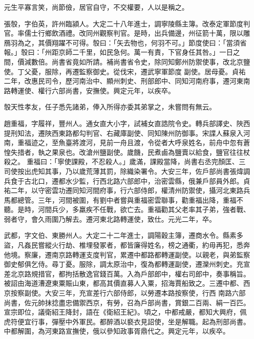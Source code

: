 \begin{pinyinscope}
 元生平寡言笑，尚節儉，居官自守，不交權要，人以是稱之。



 張彀，字伯英，許州臨潁人。大定二十八年進士，調寧陵縣主簿。改泰定軍節度判官。率儒士行鄉飲酒禮。改同州觀察判官。是時，出兵備邊，州征箭十萬，限以雕鴈羽為之，其價翔躍不可得。彀曰：「矢去物也，何羽不可。」節度使曰：「當須省報。」彀曰：「州距京師二千里，如民急何。萬一有責，下官身任其咎。」一日之間，價減數倍。尚書省竟如所請。補尚書省令史，除同知鄭州防禦使事，改北京鹽使。丁父憂，服除，再遷監察御史。從伐宋，遷武寧軍節度
 副使。居母憂。貞祐二年，改惠民司令，歷河南治中、顯州刺史、刑部郎中、同知河南府事，遷河東南路轉運使、權行六部尚書，安撫使。興定元年，以疾卒。



 彀天性孝友，任子悉先諸弟，俸入所得亦委其弟掌之，未嘗問有無云。



 趙重福，字履祥，豐州人。通女直大小字，試補女直誥院令史。轉兵部譯史、陜西提刑知法，遷陜西東路都勾判官、右藏庫副使、同知陳州防御事。宋諜人蘇泉入河南，重福迹之，至魚臺將渡河，見前一舟且渡，令從者大呼泉姓名，前舟中忽有蒼惶失措者，執之果泉也。改滄州鹽副使。歲饑，民煮鹵為鹽賣以給食，鹽官往往杖殺之。
 重福曰：「寧使課殿，不忍殺人。」歲滿，課殿當降，尚書右丞完顏匡、三司使按出虎知其事，乃以歲荒薄其罰，除織染署令。大安三年，佐戶部尚書張煒調兵食于古北口，遷都水少監，行西北路六部郎中，治密雲縣，俄兼戶部員外郎。貞祐二年，以守密雲功遷同知河間府事，行六部侍郎，權清州防禦使，攝河北東路兵馬都總管。三年，河間被圍，有劉中者嘗與重福密雲聯事，勸重福出降，重福不聽。是時，河間兵少，多羸疾不任戰，欲亡去。重福勸其父老率其子弟，強者戰、弱者守，會久雨圍乃解去。遷河東北路轉運使，致仕。元光二年，卒。



 武都，字文伯、東勝州人。大定二十二年進士，調陽穀主簿，遷商水令。縣素多盜，凡姦民嘗縱火行劫、椎埋發冢者，都皆廉得姓名，榜之通衢，約毋再犯，悉奔他境。察廉，遷南京路轉運支度判官，累遷中都路都轉運副使。以親老，與弟監察御史郁俱乞侍。尋丁憂。服除，調太原治中，復為都轉運副使，遷灤州刺史。充宣差北京路規措官，都拘括散逸官錢百萬。入為戶部郎中，權右司郎中，奏事稱旨。被詔由海道漕遼東粟賑山東，都高其價直募人入粟，招海賈船致之。三遷中都、西京按察副使。大安三年，充宣差行六部侍郎，以勞遷本路按察使，行西
 南路六部尚書，佐元帥抹捻盡忠備禦西京，有勞，召為戶部尚書，賞銀二百兩、絹一百匹。宣宗即位，議衛紹王降封，語在《衛紹王紀》。頃之，中都戒嚴，都知大興府，佩虎符便宜行事，彈壓中外軍民。都醉酒以褻衣見詔使，坐是解職。起為刑部尚書。中都解圍，為河東路宣撫使，俄以參知政事胥鼎代之。興定元年，以疾卒。




\end{pinyinscope}
